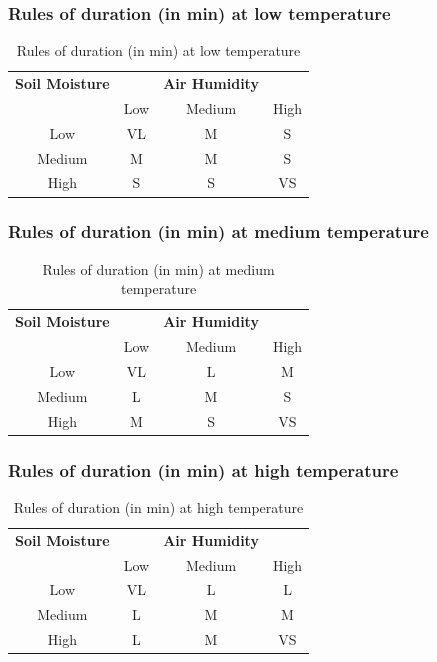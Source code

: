 \documentclass[conference]{IEEEtran}
\begin{document}
\subsubsection{Rules of duration (in min) at low temperature}
 \begin{table}[!ht]
    \caption{Rules of duration (in min) at low temperature}
    \label{table:low_temp_rules}
    \centering
    \begin{tabular}{c  | c c c}
        \hline 
        \bfseries Soil Moisture & \bfseries & \bfseries  Air Humidity & \bfseries\\
                & Low   & Medium    & High\\
         \hline
        Low     & VL    & M         & S\\
        Medium  & M     & M         & S \\
        High    & S     & S         & VS\\
    \hline
    \end{tabular}
\end{table}

\subsubsection{Rules of duration (in min) at medium temperature}
 \begin{table}[!ht]
    \caption{Rules of duration (in min) at medium temperature}
    \label{table:medium_temp_rules}
    \centering
    \begin{tabular}{c  | c c c}
        \hline 
        \bfseries Soil Moisture & \bfseries & \bfseries  Air Humidity & \bfseries\\
                & Low   & Medium    & High\\
         \hline
        Low     & VL    & L         & M\\
        Medium  & L     & M         & S \\
        High    & M     & S         & VS\\
    \hline
    \end{tabular}
\end{table}

\subsubsection{Rules of duration (in min) at high temperature}
 \begin{table}[!ht]
    \caption{Rules of duration (in min) at high temperature}
    \label{table:high_temp_rules}
    \centering
    \begin{tabular}{c  | c c c}
        \hline 
        \bfseries Soil Moisture & \bfseries & \bfseries  Air Humidity & \bfseries\\
                & Low   & Medium    & High\\
         \hline
        Low     & VL    & L         & L\\
        Medium  & L     & M         & M \\
        High    & L     & M         & VS\\
    \hline
    \end{tabular}
\end{table}
\end{document}

